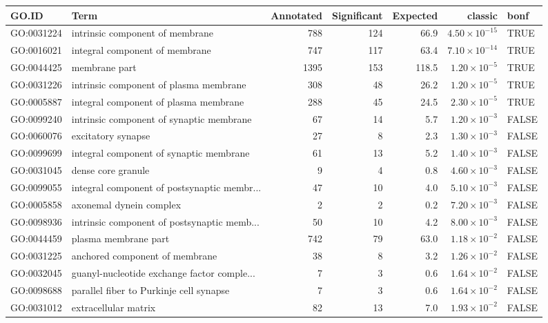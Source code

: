 \begin{table}[ht]
\centering
\begin{adjustbox}{max width=\textwidth}
\begin{tabular}{llrrrrl}
  \hline
GO.ID & Term & Annotated & Significant & Expected & classic & bonf \\ 
  \hline
GO:0031224 & intrinsic component of membrane & 788 & 124 & 66.9 & $4.50 \times 10^{-15}$ & TRUE \\ 
  GO:0016021 & integral component of membrane & 747 & 117 & 63.4 & $7.10 \times 10^{-14}$ & TRUE \\ 
  GO:0044425 & membrane part & 1395 & 153 & 118.5 & $1.20 \times 10^{-5}$ & TRUE \\ 
  GO:0031226 & intrinsic component of plasma membrane & 308 & 48 & 26.2 & $1.20 \times 10^{-5}$ & TRUE \\ 
  GO:0005887 & integral component of plasma membrane & 288 & 45 & 24.5 & $2.30 \times 10^{-5}$ & TRUE \\ 
  GO:0099240 & intrinsic component of synaptic membrane & 67 & 14 & 5.7 & $1.20 \times 10^{-3}$ & FALSE \\ 
  GO:0060076 & excitatory synapse & 27 & 8 & 2.3 & $1.30 \times 10^{-3}$ & FALSE \\ 
  GO:0099699 & integral component of synaptic membrane & 61 & 13 & 5.2 & $1.40 \times 10^{-3}$ & FALSE \\ 
  GO:0031045 & dense core granule & 9 & 4 & 0.8 & $4.60 \times 10^{-3}$ & FALSE \\ 
  GO:0099055 & integral component of postsynaptic membr... & 47 & 10 & 4.0 & $5.10 \times 10^{-3}$ & FALSE \\ 
  GO:0005858 & axonemal dynein complex & 2 & 2 & 0.2 & $7.20 \times 10^{-3}$ & FALSE \\ 
  GO:0098936 & intrinsic component of postsynaptic memb... & 50 & 10 & 4.2 & $8.00 \times 10^{-3}$ & FALSE \\ 
  GO:0044459 & plasma membrane part & 742 & 79 & 63.0 & $1.18 \times 10^{-2}$ & FALSE \\ 
  GO:0031225 & anchored component of membrane & 38 & 8 & 3.2 & $1.26 \times 10^{-2}$ & FALSE \\ 
  GO:0032045 & guanyl-nucleotide exchange factor comple... & 7 & 3 & 0.6 & $1.64 \times 10^{-2}$ & FALSE \\ 
  GO:0098688 & parallel fiber to Purkinje cell synapse & 7 & 3 & 0.6 & $1.64 \times 10^{-2}$ & FALSE \\ 
  GO:0031012 & extracellular matrix & 82 & 13 & 7.0 & $1.93 \times 10^{-2}$ & FALSE \\ 

\end{tabular}
\end{adjustbox}
\end{table}

